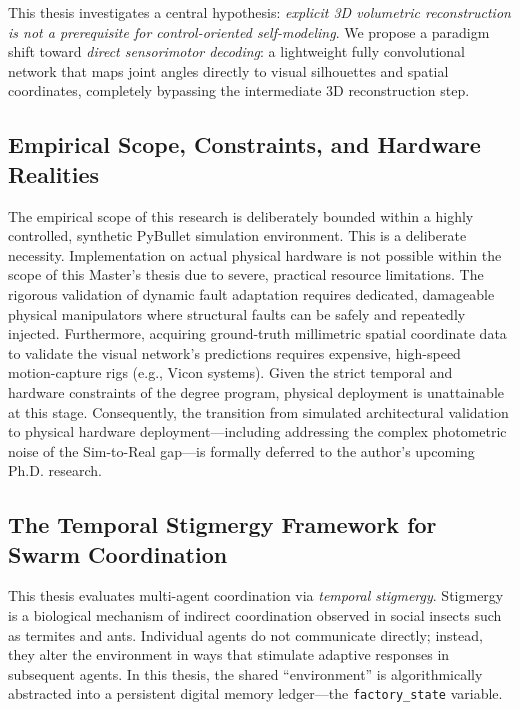 \documentclass[12pt,a4paper,oneside]{report}
\begin{document}
This thesis investigates a central hypothesis: \textit{explicit 3D volumetric reconstruction is not a prerequisite for control-oriented self-modeling}. We propose a paradigm shift toward \textit{direct sensorimotor decoding}: a lightweight fully convolutional network that maps joint angles directly to visual silhouettes and spatial coordinates, completely bypassing the intermediate 3D reconstruction step.

\subsection{Empirical Scope, Constraints, and Hardware Realities}
\label{subsec:empirical_scope_intro}

The empirical scope of this research is deliberately bounded within a highly controlled, synthetic PyBullet simulation environment. This is a deliberate necessity. Implementation on actual physical hardware is not possible within the scope of this Master's thesis due to severe, practical resource limitations. The rigorous validation of dynamic fault adaptation requires dedicated, damageable physical manipulators where structural faults can be safely and repeatedly injected. Furthermore, acquiring ground-truth millimetric spatial coordinate data to validate the visual network's predictions requires expensive, high-speed motion-capture rigs (e.g., Vicon systems). Given the strict temporal and hardware constraints of the degree program, physical deployment is unattainable at this stage. Consequently, the transition from simulated architectural validation to physical hardware deployment---including addressing the complex photometric noise of the Sim-to-Real gap---is formally deferred to the author's upcoming Ph.D. research.

\subsection{The Temporal Stigmergy Framework for Swarm Coordination}
\label{subsec:temporal_stigmergy_framework_intro}

This thesis evaluates multi-agent coordination via \textit{temporal stigmergy}. Stigmergy is a biological mechanism of indirect coordination observed in social insects such as termites and ants. Individual agents do not communicate directly; instead, they alter the environment in ways that stimulate adaptive responses in subsequent agents. In this thesis, the shared ``environment'' is algorithmically abstracted into a persistent digital memory ledger---the \texttt{factory\_state} variable.
\end{document}
